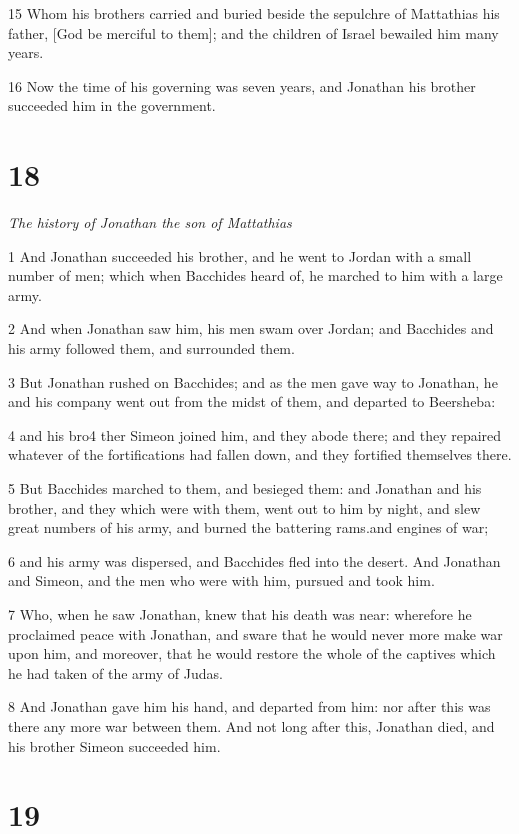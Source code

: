 15 Whom his brothers carried and buried beside the sepulchre of Mattathias his father, [God be merciful to them]; and the children of Israel bewailed him many years. 

16 Now the time of his governing was seven years, and Jonathan his brother succeeded him in the government. 

\chapter{18}

\par \textit{The history of Jonathan the son of Mattathias}

1 And Jonathan succeeded his brother, and he went to Jordan with a small number of men; which when Bacchides heard of, he marched to him with a large army. 

2 And when Jonathan saw him, his men swam over Jordan; and Bacchides and his army followed them, and surrounded them. 

3 But Jonathan rushed on Bacchides; and as the men gave way to Jonathan, he and his company went out from the midst of them, and departed to Beersheba: 

4 and his bro4 ther Simeon joined him, and they abode there; and they repaired whatever of the fortifications had fallen down, and they fortified themselves there.

5 But Bacchides marched to them, and besieged them: and Jonathan and his brother, and they which were with them, went out to him by night, and slew great numbers of his army, and burned the battering rams.and engines of war; 

6 and his army was dispersed, and Bacchides fled into the desert. And Jonathan and Simeon, and the men who were with him, pursued and took him. 

7 Who, when he saw Jonathan, knew that his death was near: wherefore he proclaimed peace with Jonathan, and sware that he would never more make war upon him, and moreover, that he would restore the whole of the captives which he had taken of the army of Judas. 

8 And Jonathan gave him his hand, and departed from him: nor after this was there any more war between them. And not long after this, Jonathan died, and his brother Simeon succeeded him. 


\chapter{19}

